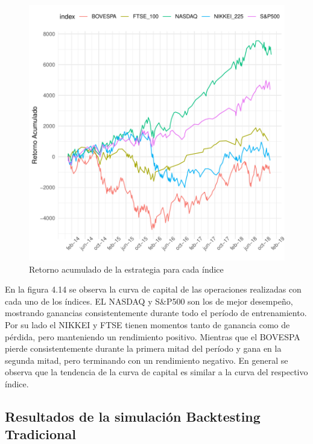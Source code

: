 \documentclass[a4paper,12pt]{Latex/Classes/PhDthesisPSnPDF}
\begin{document}
\begin{figure}[H]
\centering
\includegraphics{main-032}
\caption{Retorno acumulado de la estrategia para cada índice}
\end{figure}

En la figura 4.14 se observa la curva de capital de las operaciones realizadas con cada uno de los índices. EL NASDAQ y S\&P500 son los de mejor desempeño, mostrando ganancias consistentemente durante todo el período de entrenamiento. Por su lado el NIKKEI y FTSE tienen momentos tanto de ganancia como de pérdida, pero manteniendo un rendimiento positivo. Mientras que el BOVESPA pierde consistentemente durante la primera mitad del período y gana en la segunda mitad, pero terminando con un rendimiento negativo. En general se observa que la tendencia de la curva de capital es similar a la curva del respectivo índice.

\subsection{Resultados de la simulación Backtesting Tradicional}
\end{document}
